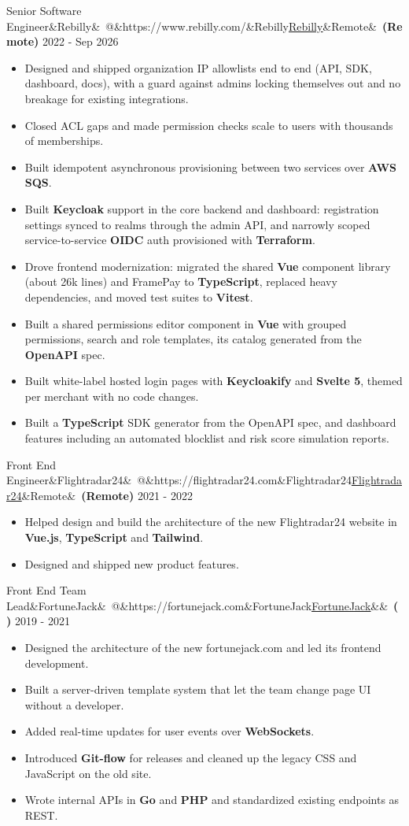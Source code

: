 \documentclass[10pt]{article}
\makeatletter
\newcommand{\weblink}[2]{\href{#1}{\textcolor{linkblue}{\underline{#2}}}}
\newcommand{\role}[5]{%
  \vspace{5pt}\par\noindent
  {\normalsize #1\ifx&#2&\else\ @\ifx&#3&#2\else\weblink{#3}{#2}\fi\fi\ifx&#4&\else\ \textbf{(#4)}\fi}%
  \hfill{\footnotesize #5}\par\nopagebreak\vspace{1pt}}
\makeatother
\begin{document}
\role{Senior Software Engineer}{Rebilly}{https://www.rebilly.com/}{Remote}{2022 - Sep 2026}
\begin{itemize}
  \item Designed and shipped organization IP allowlists end to end (API, SDK, dashboard, docs), with a guard against admins locking themselves out and no breakage for existing integrations.
  \item Closed ACL gaps and made permission checks scale to users with thousands of memberships.
  \item Built idempotent asynchronous provisioning between two services over \textbf{AWS SQS}.
  \item Built \textbf{Keycloak} support in the core backend and dashboard: registration settings synced to realms through the admin API, and narrowly scoped service-to-service \textbf{OIDC} auth provisioned with \textbf{Terraform}.
  \item Drove frontend modernization: migrated the shared \textbf{Vue} component library (about 26k lines) and FramePay to \textbf{TypeScript}, replaced heavy dependencies, and moved test suites to \textbf{Vitest}.
  \item Built a shared permissions editor component in \textbf{Vue} with grouped permissions, search and role templates, its catalog generated from the \textbf{OpenAPI} spec.
  \item Built white-label hosted login pages with \textbf{Keycloakify} and \textbf{Svelte 5}, themed per merchant with no code changes.
  \item Built a \textbf{TypeScript} SDK generator from the OpenAPI spec, and dashboard features including an automated blocklist and risk score simulation reports.
\end{itemize}

\role{Front End Engineer}{Flightradar24}{https://flightradar24.com}{Remote}{2021 - 2022}
\begin{itemize}
  \item Helped design and build the architecture of the new Flightradar24 website in \textbf{Vue.js}, \textbf{TypeScript} and \textbf{Tailwind}.
  \item Designed and shipped new product features.
\end{itemize}

\role{Front End Team Lead}{FortuneJack}{https://fortunejack.com}{}{2019 - 2021}
\begin{itemize}
  \item Designed the architecture of the new fortunejack.com and led its frontend development.
  \item Built a server-driven template system that let the team change page UI without a developer.
  \item Added real-time updates for user events over \textbf{WebSockets}.
  \item Introduced \textbf{Git-flow} for releases and cleaned up the legacy CSS and JavaScript on the old site.
  \item Wrote internal APIs in \textbf{Go} and \textbf{PHP} and standardized existing endpoints as REST.
\end{itemize}
\end{document}
